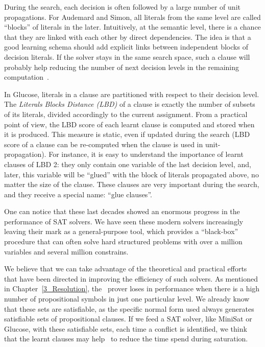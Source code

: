 During the search, each decision is often followed by a large number of unit
propagations. For Audemard and Simon, all literals from the same level are
called ``blocks'' of literals in the later. Intuitively, at the semantic level,
there is a chance that they are linked with each other by direct dependencies.
The idea is that a good learning schema should add explicit links between
independent blocks of decision literals. If the solver stays in the same search
space, such a clause will probably help reducing the number of next decision
levels in the remaining computation~\cite{audemard2009predicting}.

In Glucose, literals in a clause are partitioned with respect to their decision
level. The \emph{Literals Blocks Distance (LBD)} of a clause is exactly the
number of subsets of its literals, divided accordingly to the current
assignment. From a practical point of view, the LBD score of each learnt clause
is computed and stored when it is produced. This measure is static, even if
updated during the search (LBD score of a clause can be re-computed when the clause
is used in unit-propagation). For instance, it is easy to understand the
importance of learnt clauses of LBD 2: they only contain one variable of the
last decision level, and, later, this variable will be ``glued'' with the block
of literals propagated above, no matter the size of the clause. These clauses
are very important during the search, and they receive a special name: ``glue
clauses''.

One can notice that these last decades showed an enormous progress in the
performance of SAT solvers. We have seen these modern solvers increasingly leaving
their mark as a general-purpose tool, which provides a ``black-box'' procedure
that can often solve hard structured problems with over a million variables and
several million constrains. 

We believe that we can take advantage of the theoretical and practical efforts
that have been directed in improving the efficiency of such solvers. As
mentioned in Chapter~\ref{3_Resolution}, the \ksp\ prover loses in performance
when there is a high number of propositional symbols in just one particular
level. We already know that these sets are satisfiable, as the specific normal
form used always generates satisfiable sets of propositional clauses. If we
feed a SAT solver, like MiniSat or Glucose, with these satisfiable sets, each
time a conflict is identified, we think that the learnt clauses may help \ksp\
to reduce the time spend during saturation.
